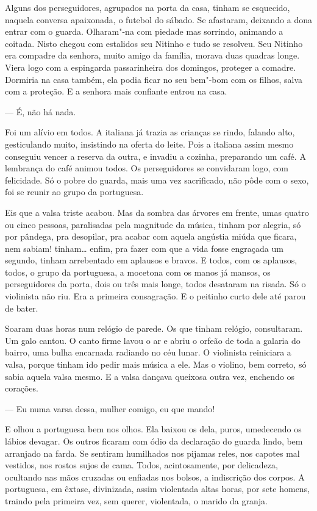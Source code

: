Alguns dos perseguidores, agrupados na porta da casa, tinham se
esquecido, naquela conversa apaixonada, o futebol do sábado. Se
afastaram, deixando a dona entrar com o guarda. Olharam"-na com piedade
mas sorrindo, animando a coitada. Nisto chegou com estalidos seu Nitinho
e tudo se resolveu. Seu Nitinho era compadre da senhora, muito amigo da
família, morava duas quadras longe. Viera logo com a espingarda
passarinheira dos domingos, proteger a comadre. Dormiria na casa também,
ela podia ficar no seu bem"-bom com os filhos, salva com a proteção. E a
senhora mais confiante entrou na casa.

--- É, não há nada.

Foi um alívio em todos. A italiana já trazia as crianças se rindo,
falando alto, gesticulando muito, insistindo na oferta do leite. Pois a
italiana assim mesmo conseguiu vencer a reserva da outra, e invadiu a
cozinha, preparando um café. A lembrança do café animou todos. Os
perseguidores se convidaram logo, com felicidade. Só o pobre do guarda,
mais uma vez sacrificado, não pôde com o sexo, foi se reunir ao grupo da
portuguesa.

Eis que a valsa triste acabou. Mas da sombra das árvores em frente, umas
quatro ou cinco pessoas, paralisadas pela magnitude da música, tinham
por alegria, só por pândega, pra desopilar, pra acabar com aquela
angústia miúda que ficara, nem sabiam! tinham\ldots{} enfim, pra fazer com
que a vida fosse engraçada um segundo, tinham arrebentado em aplausos e
bravos. E todos, com os aplausos, todos, o grupo da portuguesa, a
mocetona com os manos já mansos, os perseguidores da porta, dois ou três
mais longe, todos desataram na risada. Só o violinista não riu. Era a
primeira consagração. E o peitinho curto dele até parou de bater.

Soaram duas horas num relógio de parede. Os que tinham relógio,
consultaram. Um galo cantou. O canto firme lavou o ar e abriu o orfeão
de toda a galaria do bairro, uma bulha encarnada radiando no céu lunar.
O violinista reiniciara a valsa, porque tinham ido pedir mais música a
ele. Mas o violino, bem correto, só sabia aquela valsa mesmo. E a valsa
dançava queixosa outra vez, enchendo os corações.

--- Eu numa varsa dessa, mulher comigo, eu que mando!

E olhou a portuguesa bem nos olhos. Ela baixou os dela, puros,
umedecendo os lábios devagar. Os outros ficaram com ódio da declaração
do guarda lindo, bem arranjado na farda. Se sentiram humilhados nos
pijamas reles, nos capotes mal vestidos, nos rostos sujos de cama.
Todos, acintosamente, por delicadeza, ocultando nas mãos cruzadas ou
enfiadas nos bolsos, a indiscrição dos corpos. A portuguesa, em êxtase,
divinizada, assim violentada altas horas, por sete homens, traindo pela
primeira vez, sem querer, violentada, o marido da granja.

